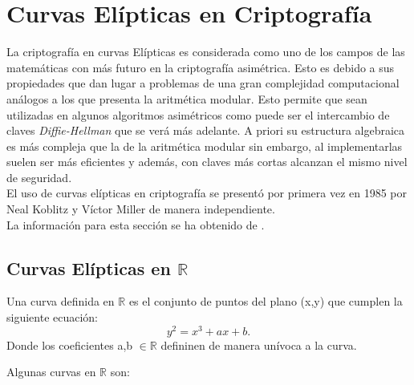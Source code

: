 \section{Curvas Elípticas en Criptografía}
La criptografía en curvas Elípticas es considerada como uno de los campos de las matemáticas con más futuro en la criptografía asimétrica.
Esto es debido a sus propiedades que dan lugar a problemas de una gran complejidad computacional análogos a los que presenta la aritmética modular. 
Esto permite que sean utilizadas en algunos algoritmos asimétricos como puede ser el intercambio de claves \emph{Diffie-Hellman} que se verá más adelante. A priori su 
estructura algebraica es más compleja que la de la aritmética modular sin embargo, al implementarlas suelen ser más eficientes y además, con claves más cortas alcanzan 
el mismo nivel de seguridad.\\
El uso de curvas elípticas en criptografía se presentó por primera vez en 1985 por Neal Koblitz y Víctor Miller de manera independiente.\\
La información para esta sección se ha obtenido de \cite{En2011}.

\subsection{Curvas Elípticas en $\mathbb{R}$}
\begin{definicion}
	Una curva definida en $\mathbb{R}$ es el conjunto de puntos del plano (x,y) que cumplen la siguiente ecuación:
$$
	y^2=x^3+ax+b.
$$
Donde los coeficientes a,b $\in \mathbb{R}$ defininen de manera unívoca a la curva.
\end{definicion}
Algunas curvas en $\mathbb{R}$ son:

\begin{figure}[H]
	\centering
	\qquad
\end{figure}

